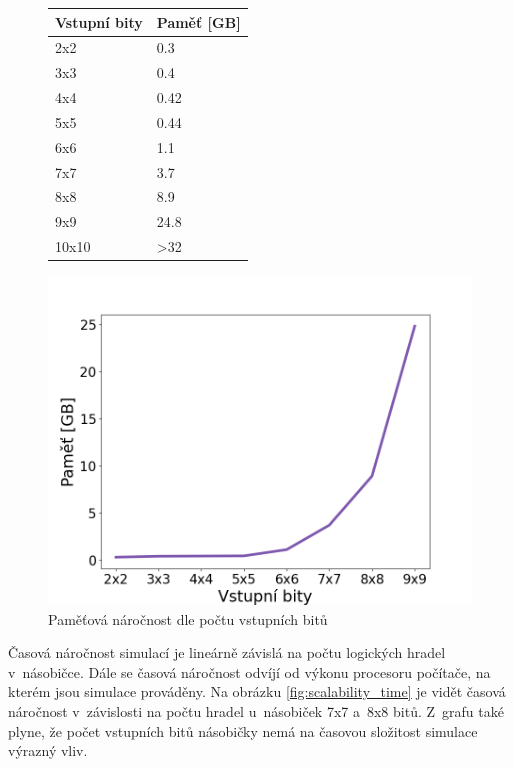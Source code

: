 \begin{figure}[H]
  \begin{minipage}[b]{.47\linewidth}
    \centering
    \begin{tabular}{|l|l|}
        \textbf{Vstupní bity} & \textbf{Paměť [GB]} \\ \hline
        2x2 & 0.3 \\ 
        3x3 & 0.4 \\ 
        4x4 & 0.42 \\ 
        5x5 & 0.44 \\ 
        6x6 & 1.1 \\ 
        7x7 & 3.7 \\ 
        8x8 & 8.9 \\ 
        9x9 & 24.8 \\ 
        10x10 & >32 \\ 
    \end{tabular}
    \label{tab:scalability_memory}
  \end{minipage}
  \begin{minipage}[b]{.47\linewidth}
    \centering
    \includegraphics[width=\linewidth]{obrazky-figures/scalability_memory.png}
    \caption{Paměťová náročnost dle počtu vstupních bitů}
    \label{fig:scalability_memory}
  \end{minipage}\hfill
\end{figure}
\pagebreak
Časová náročnost simulací je lineárně závislá na počtu logických hradel v~násobičce. Dále se časová náročnost odvíjí od výkonu procesoru počítače, na kterém jsou simulace prováděny. Na obrázku \ref{fig:scalability_time} je vidět časová náročnost v~závislosti na počtu hradel u~násobiček 7x7 a~8x8 bitů. Z~grafu také plyne, že počet vstupních bitů násobičky nemá na časovou složitost simulace výrazný vliv.

